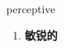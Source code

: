 
\begin{frame}
{\huge perceptive}
\begin{center}
\begin{enumerate}\Large
  \item \textbf{敏锐的}
\end{enumerate}
\end{center}
\end{frame}
